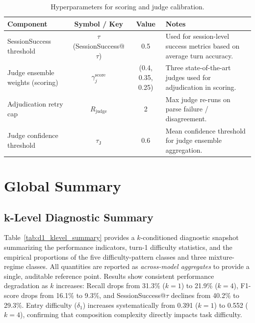 \begin{table}[t]
\caption{Hyperparameters for scoring and judge calibration.}
\centering
\footnotesize
\setlength{\tabcolsep}{3pt}
\renewcommand{\arraystretch}{1.0}
\begin{tabularx}{\textwidth}{@{}p{4.3cm} c c p{7.5cm}@{}}
\toprule
\textbf{Component} & \textbf{Symbol / Key} & \textbf{Value} & \textbf{Notes} \\
\midrule
SessionSuccess threshold & $\tau$ (SessionSuccess@$\tau$) & 0.5 & Used for session-level success metrics based on average turn accuracy. \\
Judge ensemble weights (scoring) & $\gamma^{\mathrm{score}}_{j}$ & (0.4, 0.35, 0.25) & Three state-of-the-art judges used for adjudication in scoring. \\
Adjudication retry cap & $R_{\mathrm{judge}}$ & 2 & Max judge re-runs on parse failure / disagreement. \\
Judge confidence threshold & $\tau_{\mathrm{J}}$ & 0.6 & Mean confidence threshold for judge ensemble aggregation. \\
\bottomrule
\end{tabularx}
\label{tab:hyper_scoring}
\end{table}


\clearpage
{}
\section{Global Summary}
\label{app:full_results}

\subsection{k-Level Diagnostic Summary}
Table~\ref{tab:d1_klevel_summary} provides a $k$-conditioned diagnostic snapshot summarizing the performance indicators, turn-1 difficulty statistics, and the empirical proportions of the five difficulty-pattern classes and three mixture-regime classes. All quantities are reported as \emph{across-model aggregates} to provide a single, auditable reference point. Results show consistent performance degradation as $k$ increases: Recall drops from 31.3\% ($k{=}1$) to 21.9\% ($k{=}4$), F1-score drops from 16.1\% to 9.3\%, and SessionSuccess@$\tau$ declines from 40.2\% to 29.3\%. Entry difficulty ($\delta_1$) increases systematically from 0.391 ($k{=}1$) to 0.552 ($k{=}4$), confirming that composition complexity directly impacts task difficulty.

